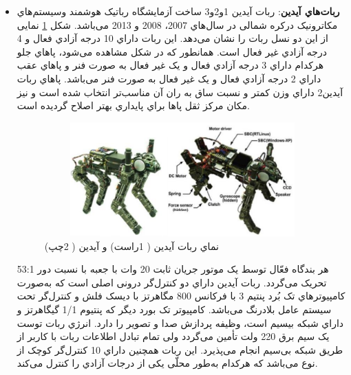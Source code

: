 \begin{itemize}
\item
\textbf{ربات‌هاي آیدین}:
ربات آیدین 1و2و3 
\unskip{}
ساخت آزمایشگاه رباتیک هوشمند وسیستم‌هاي مكاترونیک
\unskip{}
درکره شمالی در سال‌هاي 2007، 2008 و 2013 می‌باشد\cite{Aidin-I-2}\cite{Aidin-III-1}\cite{Aidin-III-2}\cite{Aidin-I-1}. شكل
\ref{ربات آیدین}
نمایی از این دو نسل ربات را نشان می‌دهد. این ربات داراي 10 درجه آزادي فعال و 4 درجه آزادي غیر فعال است. همانطور که در شكل مشاهده می‌شود، پاهاي جلو هرکدام داراي  3 درجه آزادي فعال و یک غیر فعال به صورت فنر و پاهاي عقب داراي 2 درجه آزادي فعال و یک غیر فعال به صورت فنر می‌باشد. پاهاي ربات آیدین2 داراي وزن کمتر و نسبت ساق به ران آن مناسب‌تر انتخاب شده است و نیز مكان مرکز ثقل پاها براي پایداري بهتر اصلاح گردیده است.
    \begin{figure}[!h]
	\centering
	\includegraphics[height=4.4cm,width=12cm]{./Images/CH1/AiDIN_robot.png}
	\caption[نماي ربات آیدین ( 1راست) و آیدین ( 2چپ)]{نماي ربات آیدین ( 1راست) و آیدین ( 2چپ)\cite{Aidin-I-1}}
	\label{ربات آیدین}
	\end{figure}	

\newpage
هر بندگاه فعّال توسط یک موتور جریان ثابت 20 وات با جعبه با نسبت دور  53:1 تحریک می‌گردد. ربات آیدین داراي دو کنترل‌گر درونی
\unskip{}
اصلی است که به‌صورت کامپیوترهاي تک بُرد پنتیم 3 با فرکانس 800 مگاهرتز با دیسک فلش و کنترل‌گر
\unskip{}
تحت سیستم عامل بلادرنگ
می‌باشد. کامپیوتر تک بورد دیگر که پنتیوم 1/1 گیگاهرتز و داراي شبكه بیسیم است، وظیفه پردازش صدا و تصویر را دارد. انرژي ربات توست یک سیم برق 220 ولت تأمین می‌گردد ولی تمام تبادل اطلاعات ربات با کاربر از طریق شبكه بی‌سیم انجام می‌پذیرد. این ربات همچنین داراي 10 کنترل‌گر کوچک از نوع
می‌باشد که هرکدام به‌طور محلّی یكی از درجات آزادي را کنترل می‌کند.


\end{itemize}
